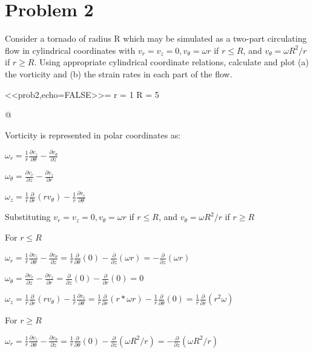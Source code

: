 \documentclass{article}
\begin{document}




\pagebreak


\section*{Problem 2}

Consider a tornado of radius R which may be simulated as a two-part circulating flow in cylindrical 
coordinates with $v_{r} = v_{z} = 0, v_{\theta} = \omega r$ if $r \leq R$, and $v_{\theta} = \omega R^{2}/r$ if $r \geq R$. 
Using appropriate cylindrical coordinate relations, calculate and plot (a) the vorticity and (b) the 
strain rates in each part of the flow.

<<prob2,echo=FALSE>>=
r = 1
R = 5

@

Vorticity is represented in polar coordinates as:

$\omega_{r} = \frac{1}{r}\frac{\partial v_{z}}{\partial \theta}-\frac{\partial
v_{\theta}}{\partial z}$

$\omega_{\theta} = \frac{\partial v_{r}}{\partial z}-\frac{\partial
v_{z}}{\partial r}$

$\omega_{z} = \frac{1}{r}\frac{\partial}{\partial r}(rv_{\theta}) - \frac{1}{r}\frac{\partial v_{r}}{\partial \theta}$


\hline

Substituting $v_{r} = v_{z} = 0, v_{\theta} = \omega r$ if $r \leq R$, and $v_{\theta} = \omega R^{2}/r$ if $r \geq R$


For $r \leq R$

$\omega_{r} = \frac{1}{r}\frac{\partial v_{z}}{\partial \theta}-\frac{\partial
v_{\theta}}{\partial z} = \frac{1}{r}\frac{\partial }{\partial \theta}(0)-\frac{\partial
}{\partial z}(\omega r) = -\frac{\partial
}{\partial z}(\omega r)
$

$\omega_{\theta} = \frac{\partial v_{r}}{\partial z}-\frac{\partial
v_{z}}{\partial r} = \frac{\partial}{\partial z}(0)-\frac{\partial}{\partial r}(0) = 0$

$\omega_{z} = \frac{1}{r}\frac{\partial}{\partial r}(rv_{\theta}) -
\frac{1}{r}\frac{\partial v_{r}}{\partial \theta} = \frac{1}{r}\frac{\partial}{\partial r}(r*\omega r) -
\frac{1}{r}\frac{\partial}{\partial \theta}(0) = \frac{1}{r}\frac{\partial}{\partial r}(r^{2}\omega)$

For $r \geq R$

$\omega_{r} = \frac{1}{r}\frac{\partial v_{z}}{\partial \theta}-\frac{\partial
v_{\theta}}{\partial z} = \frac{1}{r}\frac{\partial }{\partial \theta}(0)-\frac{\partial
}{\partial z}(\omega R^{2}/r) = -\frac{\partial
}{\partial z}(\omega R^{2}/r)
$
\end{document}
